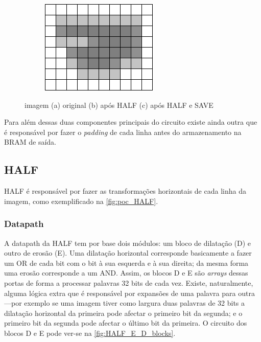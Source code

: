 \documentclass[a4paper]{article}
\begin{document}
\begin{figure}[h]
\begin{subfigure}[b]{0.32\textwidth}
		\includegraphics[width=\linewidth]{poc_SAVE}
		\caption{}
		\label{fig:poc_SAVE}
	\end{subfigure}
	\caption{imagem (a) original (b) após HALF (c) após HALF e SAVE}
	\label{fig:poc}
\end{figure}

Para além dessas duas componentes principais do circuito existe ainda outra que é responsável por fazer o \textit{padding} de cada linha antes do armazenamento na BRAM de saída.

\subsection{HALF}
HALF é responsável por fazer as transformações horizontais de cada linha da imagem, como exemplificado na \autoref{fig:poc_HALF}.

\subsubsection{Datapath}
A datapath da HALF tem por base dois módulos: um bloco de dilatação (D) e outro de erosão (E). Uma dilatação horizontal corresponde basicamente a fazer um OR de cada bit com o bit à sua esquerda e à sua direita; da mesma forma uma erosão corresponde a um AND. Assim, os blocos D e E são \textit{arrays} dessas portas de forma a processar palavras 32 bits de cada vez. Existe, naturalmente, alguma lógica extra que é responsável por expansões de uma palavra para outra---por exemplo se uma imagem tiver como largura duas palavras de 32 bits a dilatação horizontal da primeira pode afectar o primeiro bit da segunda; e o primeiro bit da segunda pode afectar o último bit da primeira. O circuito dos blocos D e E pode ver-se na \autoref{fig:HALF_E_D_blocks}.
\end{document}
